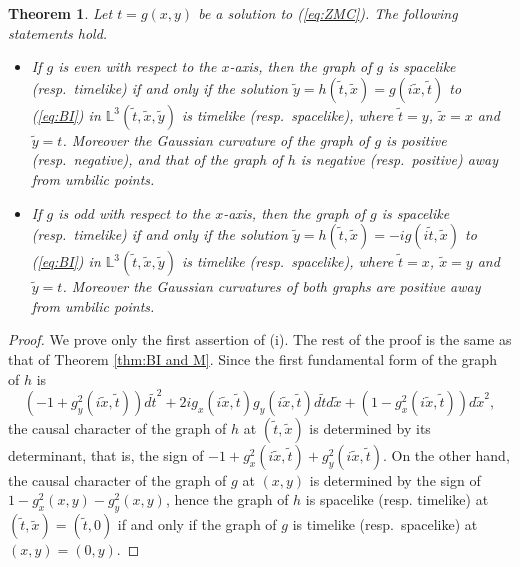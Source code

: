 \documentclass[12pt,amstex]{amsart}%
\theoremstyle{plain} %
\newtheorem{theorem}{Theorem}[section]
\theoremstyle{definition}
\begin{document}
\begin{theorem}\label{thm:BI and ZMC}
Let $t=g(x,y)$ be a solution to (\ref{eq:ZMC}). The following statements hold.
\begin{itemize}
\item[(i)] If $g$ is even with respect to the $x$-axis, then the graph of $g$ is spacelike (resp.\ timelike) if and only if the solution $\tilde{y}=h(\tilde{t},\tilde{x})=g(i\tilde{x},\tilde{t})$ to (\ref{eq:BI}) in $\mathbb{L}^3(\tilde{t},\tilde{x},\tilde{y})$ is timelike (resp.\ spacelike), where $\tilde{t}=y$, $\tilde{x}=x$ and $\tilde{y}=t$. Moreover the Gaussian curvature of the graph of $g$ is positive (resp.\ negative), and that of the graph of $h$ is negative (resp.\ positive) away from umbilic points.
\item[(ii)]If $g$ is odd with respect to the $x$-axis, then the graph of $g$ is spacelike (resp.\ timelike) if and only if the solution $\tilde{y}=h(\tilde{t},\tilde{x})=-ig(i\tilde{t},\tilde{x})$ to (\ref{eq:BI}) in $\mathbb{L}^3(\tilde{t},\tilde{x},\tilde{y})$ is timelike (resp.\ spacelike), where $\tilde{t}=x$, $\tilde{x}=y$ and $\tilde{y}=t$. Moreover the Gaussian curvatures of both graphs  are positive away from umbilic points.
\end{itemize}
\end{theorem}
\begin{proof}
We prove only the first assertion of (i). The rest of the proof is the same as that of Theorem \ref{thm:BI and M}. 
Since the first fundamental form of the graph of $h$ is
\[
(-1+g_y^2(i\tilde{x},\tilde{t}))d\tilde{t}^2+2ig_x(i\tilde{x},\tilde{t})g_y(i\tilde{x},\tilde{t})d\tilde{t}d\tilde{x}+(1-g_x^2(i\tilde{x},\tilde{t}))d\tilde{x}^2,
\]
the causal character of the graph of $h$ at $(\tilde{t},\tilde{x})$ is determined by its determinant, that is, the sign of $-1+g_x^2(i\tilde{x},\tilde{t})+g_y^2(i\tilde{x},\tilde{t})$.
On the other hand, the causal character of the graph of $g$ at $(x,y)$ is determined by the sign of $1-g_x^2(x,y)-g_y^2(x,y)$, hence the graph of $h$ is spacelike (resp. timelike) at $(\tilde{t},\tilde{x})=(\tilde{t},0)$ if and only if the graph of $g$ is timelike (resp.\ spacelike) at $(x,y)=(0,y)$.
\end{proof}
\end{document}
